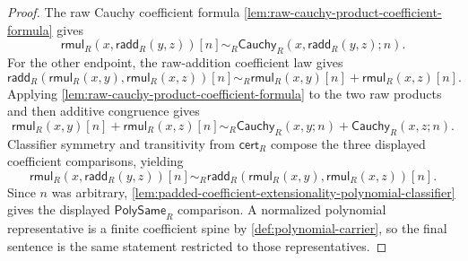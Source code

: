 \begin{proof}
The raw Cauchy coefficient formula \autoref{lem:raw-cauchy-product-coefficient-formula} gives
$$
\mathsf{rmul}_R(x,\mathsf{radd}_R(y,z))[n]
\sim_R
\mathsf{Cauchy}_R(x,\mathsf{radd}_R(y,z);n).
$$
For the other endpoint, the raw-addition coefficient law gives
$$
\mathsf{radd}_R(\mathsf{rmul}_R(x,y),\mathsf{rmul}_R(x,z))[n]
\sim_R
\mathsf{rmul}_R(x,y)[n]+\mathsf{rmul}_R(x,z)[n].
$$
Applying \autoref{lem:raw-cauchy-product-coefficient-formula} to the two raw products and then additive congruence gives
$$
\mathsf{rmul}_R(x,y)[n]+\mathsf{rmul}_R(x,z)[n]
\sim_R
\mathsf{Cauchy}_R(x,y;n)+\mathsf{Cauchy}_R(x,z;n).
$$
Classifier symmetry and transitivity from $\mathsf{cert}_R$ compose the three displayed coefficient comparisons, yielding
$$
\mathsf{rmul}_R(x,\mathsf{radd}_R(y,z))[n]
\sim_R
\mathsf{radd}_R(\mathsf{rmul}_R(x,y),\mathsf{rmul}_R(x,z))[n].
$$
Since $n$ was arbitrary, \autoref{lem:padded-coefficient-extensionality-polynomial-classifier} gives the displayed $\mathsf{PolySame}_R$ comparison. A normalized polynomial representative is a finite coefficient spine by \autoref{def:polynomial-carrier}, so the final sentence is the same statement restricted to those representatives.
\end{proof}

